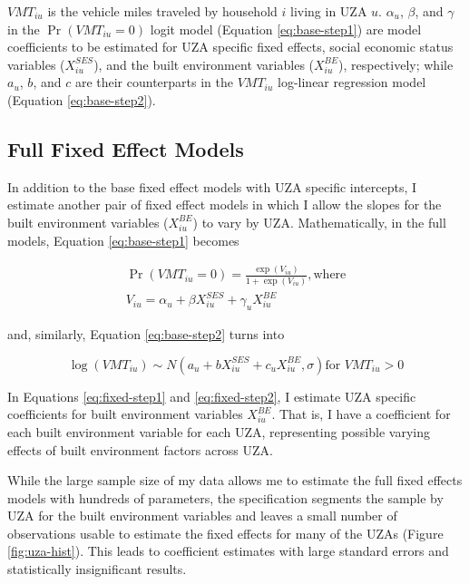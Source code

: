 \documentclass[numbered]{trbunofficial}
\begin{document}
\(VMT_{iu}\) is the vehicle miles traveled by household \(i\) living in UZA \(u\). \(\alpha_u\), \(\beta\), and \(\gamma\) in the \(\Pr(VMT_{iu}=0)\) logit model (Equation \eqref{eq:base-step1}) are model coefficients to be estimated for UZA specific fixed effects, social economic status variables (\(X_{iu}^{SES}\)), and the built environment variables (\(X_{iu}^{BE}\)), respectively; while \(a_u\), \(b\), and \(c\) are their counterparts in the \(VMT_{iu}\) log-linear regression model (Equation \eqref{eq:base-step2}).

\hypertarget{full-fixed-effect-models}{%
\subsection{Full Fixed Effect Models}\label{full-fixed-effect-models}}

In addition to the base fixed effect models with UZA specific intercepts, I estimate another pair of fixed effect models in which I allow the slopes for the built environment variables (\(X_{iu}^{BE}\)) to vary by UZA. Mathematically, in the full models, Equation \eqref{eq:base-step1} becomes

\begin{equation}
\label{eq:fixed-step1}
\begin{split}
\Pr(VMT_{iu}=0) = \frac{\exp(V_{iu})}{1 + \exp(V_{iu})}, \text{where} \\
V_{iu} = \alpha_{u} + \beta X_{iu}^{SES} + \gamma_u X_{iu}^{BE}
\end{split}
\end{equation}

and, similarly, Equation \eqref{eq:base-step2} turns into

\begin{equation}
\label{eq:fixed-step2}
\log(VMT_{iu}) \sim N(a_{u} + b X_{iu}^{SES} + c_u X_{iu}^{BE}, \sigma) \text{for } VMT_{iu} > 0
\end{equation}

In Equations \eqref{eq:fixed-step1} and \eqref{eq:fixed-step2}, I estimate UZA specific coefficients for built environment variables \(X_{iu}^{BE}\). That is, I have a coefficient for each built environment variable for each UZA, representing possible varying effects of built environment factors across UZA.

While the large sample size of my data allows me to estimate the full fixed effects models with hundreds of parameters, the specification segments the sample by UZA for the built environment variables and leaves a small number of observations usable to estimate the fixed effects for many of the UZAs (Figure \ref{fig:uza-hist}). This leads to coefficient estimates with large standard errors and statistically insignificant results.
\end{document}
